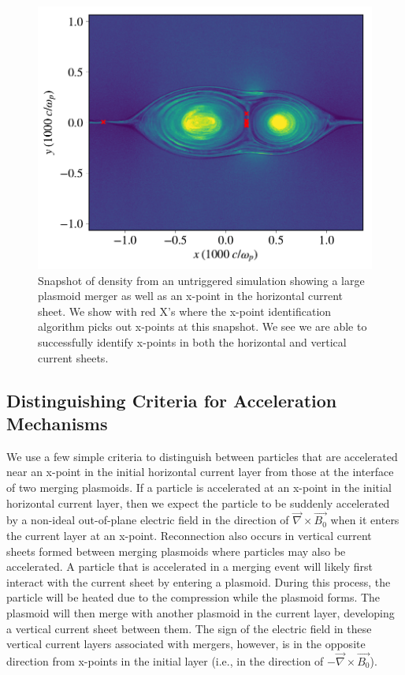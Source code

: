\documentclass[iop,twocolappendix]{emulateapj}
\begin{document}
 \begin{figure}[htp]
 	
 	\includegraphics[width=\linewidth]{xpoint_finding.pdf}
 	\caption{Snapshot of density from an untriggered simulation showing a large plasmoid merger as well as an x-point in the horizontal current sheet.  We show with red X's where the x-point identification algorithm picks out x-points at this snapshot.  We see we are able to successfully identify x-points in both the horizontal and vertical current sheets.}
 	\label{xpoint_finding}
 \end{figure}


\subsection{Distinguishing Criteria for Acceleration Mechanisms} \label{acc_mec_def}
We use a few simple criteria to distinguish between particles that are accelerated near an x-point in the initial horizontal current layer from those at the interface of two merging plasmoids.
If a particle is accelerated at an x-point in the initial horizontal current layer, then we expect the particle to be suddenly accelerated by a non-ideal out-of-plane electric field in the direction of $\vec{\nabla} \times \vec{B_{0}}$ when it enters the current layer at an x-point.  Reconnection also occurs in vertical current sheets formed between merging plasmoids where particles may also be accelerated.  A particle that is accelerated in a merging event will likely first interact with the current sheet by entering a plasmoid.  During this process, the particle will be heated due to the compression while the plasmoid forms.  The plasmoid will then merge with another plasmoid in the current layer, developing a vertical current sheet between them.  The sign of the electric field in these vertical current layers associated with mergers, however, is in the opposite direction from x-points in the initial layer (i.e., in the direction of $-\vec{\nabla} \times \vec{B_{0}}$).  
\end{document}
